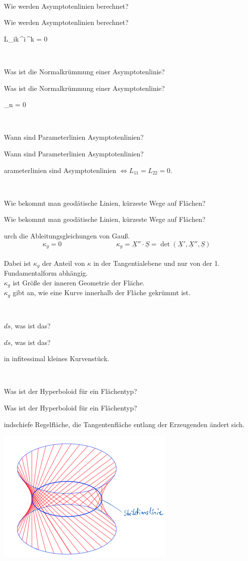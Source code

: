 \documentclass[DIV=1]{scrartcl}
\newcommand{\frage}[3][10]{
    \newpage
    \ 
    \vspace{#1 em}
    \begin{framed}
        #2
    \end{framed}
    \newpage
    \begin{framed}
        #2
    \end{framed}
    \vspace{2 em}
}
\begin{document}
\frage{Wie werden Asymptotenlinien berechnet?}

\[
    L_{ik}\,^i\,^k = 0 \qquad {}
\]



\frage{Was ist die Normalkrümmung einer Asymptotenlinie?}

\[
    \kappa_n = 0
\]



\frage{Wann sind Parameterlinien Asymptotenlinien?}

Parameterlinien sind Asymptotenlinien $\Leftrightarrow L_{11} = L_{22} = 0$.



\frage{Wie bekommt man geodätische Linien, kürzeste Wege auf Flächen?}
Durch die Ableitungsgleichungen von Gauß.
\[
    \kappa_g = 0 
    \qquad\qquad\qquad\qquad
    \kappa_g  = \underline{X}'' \cdot \underline{S} = \det(\underline{X}', \underline{X}'', \underline{S})
\]
\\
Dabei ist $\kappa_g$ der Anteil von $\kappa$ in der Tangentialebene und nur von der 1. Fundamentalform abhängig.\\
$\kappa_g$ ist Größe der inneren Geometrie der Fläche.\\
$\kappa_g$ gibt an, wie eine Kurve innerhalb der Fläche gekrümmt ist.



\frage{$ds$, was ist das?}

Ein infitessimal kleines Kurvenstück.



\frage{Was ist der Hyperboloid für ein Flächentyp?}

Windschiefe Regelfläche, die Tangentenfläche entlang der Erzeugenden ändert sich.
\\
\begin{center}
    \includegraphics[scale=1]{hyperboloid.png}
\end{center}
\end{document}
